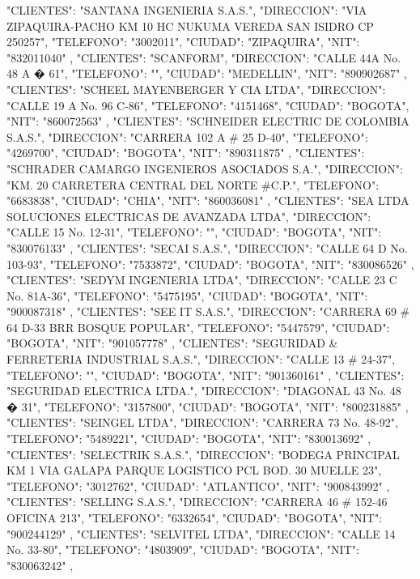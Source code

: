    {
   "CLIENTES": "SANTANA INGENIERIA S.A.S.",
   "DIRECCION": "VIA ZIPAQUIRA-PACHO KM 10 HC NUKUMA VEREDA SAN ISIDRO CP 250257",
   "TELEFONO": "3002011",
   "CIUDAD": "ZIPAQUIRA",
   "NIT": "832011040"
   },
   {
   "CLIENTES": "SCANFORM",
   "DIRECCION": "CALLE 44A No. 48 A � 61",
   "TELEFONO": "",
   "CIUDAD": "MEDELLIN",
   "NIT": "890902687"
   },
   {
   "CLIENTES": "SCHEEL MAYENBERGER Y CIA LTDA",
   "DIRECCION": "CALLE 19 A No. 96 C-86",
   "TELEFONO": "4151468",
   "CIUDAD": "BOGOTA",
   "NIT": "860072563"
   },
   {
   "CLIENTES": "SCHNEIDER ELECTRIC DE COLOMBIA S.A.S.",
   "DIRECCION": "CARRERA 102 A # 25 D-40",
   "TELEFONO": "4269700",
   "CIUDAD": "BOGOTA",
   "NIT": "890311875"
   },
   {
   "CLIENTES": "SCHRADER CAMARGO INGENIEROS ASOCIADOS S.A.",
   "DIRECCION": "KM. 20 CARRETERA CENTRAL DEL NORTE #C.P.",
   "TELEFONO": "6683838",
   "CIUDAD": "CHIA",
   "NIT": "860036081"
   },
   {
   "CLIENTES": "SEA LTDA SOLUCIONES ELECTRICAS DE AVANZADA LTDA",
   "DIRECCION": "CALLE 15 No. 12-31",
   "TELEFONO": "",
   "CIUDAD": "BOGOTA",
   "NIT": "830076133"
   },
   {
   "CLIENTES": "SECAI S.A.S.",
   "DIRECCION": "CALLE 64 D No. 103-93",
   "TELEFONO": "7533872",
   "CIUDAD": "BOGOTA",
   "NIT": "830086526"
   },
   {
   "CLIENTES": "SEDYM INGENIERIA LTDA",
   "DIRECCION": "CALLE 23 C No. 81A-36",
   "TELEFONO": "5475195",
   "CIUDAD": "BOGOTA",
   "NIT": "900087318"
   },
   {
   "CLIENTES": "SEE IT S.A.S.",
   "DIRECCION": "CARRERA 69 # 64 D-33 BRR BOSQUE POPULAR",
   "TELEFONO": "5447579",
   "CIUDAD": "BOGOTA",
   "NIT": "901057778"
   },
   {
   "CLIENTES": "SEGURIDAD & FERRETERIA INDUSTRIAL S.A.S.",
   "DIRECCION": "CALLE 13 # 24-37",
   "TELEFONO": "",
   "CIUDAD": "BOGOTA",
   "NIT": "901360161"
   },
   {
   "CLIENTES": "SEGURIDAD ELECTRICA LTDA.",
   "DIRECCION": "DIAGONAL 43 No. 48 � 31",
   "TELEFONO": "3157800",
   "CIUDAD": "BOGOTA",
   "NIT": "800231885"
   },
   {
   "CLIENTES": "SEINGEL LTDA",
   "DIRECCION": "CARRERA 73 No. 48-92",
   "TELEFONO": "5489221",
   "CIUDAD": "BOGOTA",
   "NIT": "830013692"
   },
   {
   "CLIENTES": "SELECTRIK S.A.S.",
   "DIRECCION": "BODEGA PRINCIPAL KM 1 VIA GALAPA PARQUE LOGISTICO PCL BOD. 30 MUELLE 23",
   "TELEFONO": "3012762",
   "CIUDAD": "ATLANTICO",
   "NIT": "900843992"
   },
   {
   "CLIENTES": "SELLING S.A.S.",
   "DIRECCION": "CARRERA 46 # 152-46 OFICINA 213",
   "TELEFONO": "6332654",
   "CIUDAD": "BOGOTA",
   "NIT": "900244129"
   },
   {
   "CLIENTES": "SELVITEL LTDA",
   "DIRECCION": "CALLE 14 No. 33-80",
   "TELEFONO": "4803909",
   "CIUDAD": "BOGOTA",
   "NIT": "830063242"
   },
